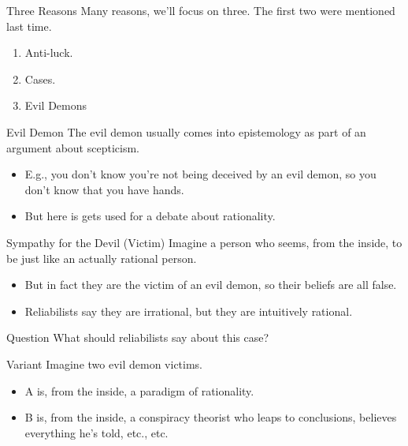 \documentclass[
  17pt,
  letterpaper,
  ignorenonframetext,
  aspectratio=169,
  handout]{beamer}
\providecommand{\tightlist}{%
  \setlength{\itemsep}{0pt}\setlength{\parskip}{0pt}}\usepackage{longtable,booktabs,array}
\begin{document}
\begin{frame}{Three Reasons}
\protect\hypertarget{three-reasons}{}
Many reasons, we'll focus on three. The first two were mentioned last
time.

\begin{enumerate}[<+->]
\tightlist
\item
  Anti-luck.
\item
  Cases.
\item
  Evil Demons
\end{enumerate}
\end{frame}

\begin{frame}{Evil Demon}
\protect\hypertarget{evil-demon}{}
The evil demon usually comes into epistemology as part of an argument
about scepticism.

\begin{itemize}[<+->]
\tightlist
\item
  E.g., you don't know you're not being deceived by an evil demon, so
  you don't know that you have hands.
\item
  But here is gets used for a debate about rationality.
\end{itemize}
\end{frame}

\begin{frame}{Sympathy for the Devil (Victim)}
\protect\hypertarget{sympathy-for-the-devil-victim}{}
Imagine a person who seems, from the inside, to be just like an actually
rational person.

\begin{itemize}[<+->]
\tightlist
\item
  But in fact they are the victim of an evil demon, so their beliefs are
  all false.
\item
  Reliabilists say they are irrational, but they are intuitively
  rational.
\end{itemize}
\end{frame}

\begin{frame}{Question}
\protect\hypertarget{question}{}
What should reliabilists say about this case?
\end{frame}

\begin{frame}{Variant}
\protect\hypertarget{variant}{}
Imagine two evil demon victims.

\begin{itemize}[<+->]
\tightlist
\item
  A is, from the inside, a paradigm of rationality.
\item
  B is, from the inside, a conspiracy theorist who leaps to conclusions,
  believes everything he's told, etc., etc.
\end{itemize}
\end{frame}
\end{document}
